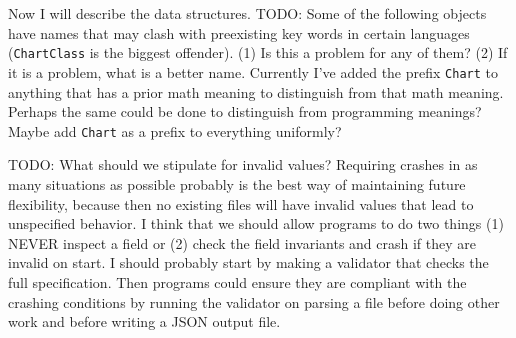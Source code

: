 \documentclass{article}
\begin{document}
Now I will describe the data structures. TODO: Some of the following objects have names that may clash with preexisting key words in certain languages (\texttt{ChartClass} is the biggest offender). (1) Is this a problem for any of them? (2) If it is a problem, what is a better name.
Currently I've added the prefix \texttt{Chart} to anything that has a prior math meaning to distinguish from that math meaning. Perhaps the same could be done to distinguish from programming meanings? Maybe add \texttt{Chart} as a prefix to everything uniformly?

TODO: What should we stipulate for invalid values? Requiring crashes in as many situations as possible probably is the best way of maintaining future flexibility, because then no existing files will have invalid values that lead to unspecified behavior.
I think that we should allow programs to do two things (1) NEVER inspect a field or (2) check the field invariants and crash if they are invalid on start.
I should probably start by making a validator that checks the full specification.
Then programs could ensure they are compliant with the crashing conditions by running the validator on parsing a file before doing other work and before writing a JSON output file.
\end{document}
